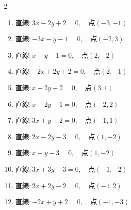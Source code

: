 \begin{multicols}{2}
\begin{enumerate}
  \item $直線:3x-2y+2=0,\quad 点 ( -3, -1 )$


  \item $直線:-3x-y-1=0,\quad 点 ( -2, 3 )$


  \item $直線:x+y-1=0,\quad 点 ( 2, -2 )$


  \item $直線:-2x+2y+2=0,\quad 点 ( 2, -1 )$


  \item $直線:x+2y-2=0,\quad 点 ( 3, 1 )$


\columnbreak %

  \item $直線:x-2y-1=0,\quad 点 ( -2, 2 )$


  \item $直線:3x+y+2=0,\quad 点 ( -1, 1 )$

        \phantom{$\displaystyle 距離 : 0$}

  \item $直線:2x-2y-3=0,\quad 点 ( 1, -2 )$


  \item $直線:x+y-3=0,\quad 点 ( 1, -2 )$


  \item $直線:3x+3y-3=0,\quad 点 ( -1, -2 )$


  \item $直線:2x+2y-2=0,\quad 点 ( -1, 2 )$

        \phantom{$\displaystyle 距離 : 0$}

  \item $直線:-2x+y+2=0,\quad 点 ( -1, -3 )$


\end{enumerate}
\end{multicols}
